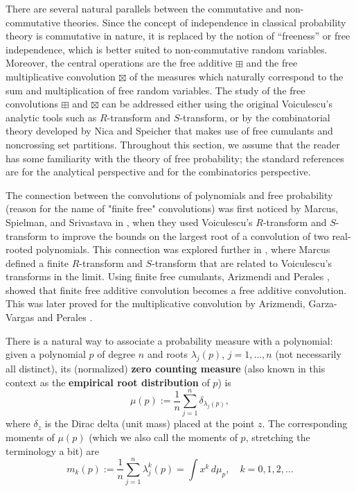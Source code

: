 \documentclass[reqno,11pt]{amsart}
\theoremstyle{remark}
\begin{document}
There are several natural parallels between the commutative and non-commutative theories. Since the concept of independence in classical probability theory is commutative in nature,  it is replaced by the notion of ``freeness'' or free independence, which is better suited to non-commutative random variables. Moreover, the central operations are the free additive $\boxplus$ and the free multiplicative convolution $\boxtimes$ of the measures which naturally correspond to the sum and multiplication of free random variables. The study of the free convolutions $\boxplus$ and $\boxtimes$ can be addressed either using the original Voiculescu's analytic tools such as $R$-transform and $S$-transform, or by the combinatorial theory developed by Nica and Speicher that makes use of free cumulants and noncrossing set partitions. Throughout this section, we assume that the reader has some familiarity with the theory of free probability; the standard references are \cite{DanKenAndu} for the analytical perspective and \cite{nica2006lectures} for the combinatorics perspective.

The connection between the convolutions of polynomials and free probability (reason for the name of "finite free" convolutions) was first noticed by Marcus, Spielman, and Srivastava in \cite{MR4408504}, when they used Voiculescu's $R$-transform and $S$-transform to improve the bounds on the largest root of a convolution of two real-rooted polynomials. This connection was explored further in \cite{marcus}, where Marcus defined a finite $R$-transform and $S$-transform that are related to Voiculescu's transforms in the limit. Using finite free cumulants, Arizmendi and Perales \cite{arizmendi2018cumulants}, showed that finite free additive convolution becomes a free additive convolution. This was later proved for the multiplicative convolution by Arizmendi, Garza-Vargas and Perales \cite{arizmendi2021finite}.

There is a natural way to associate a probability measure with a polynomial: given a polynomial $p$ of degree $n$ and roots $\lambda_j(p)$, $j=1, \dots, n$ (not necessarily all distinct),  its (normalized) \textbf{zero counting measure} (also known in this context as the \textbf{empirical root distribution} of $p$) is
\begin{equation}
    \label{def:zerocountingmeasure}
    \mu (p):=\frac{1}{n}\sum_{j=1}^n \delta_{\lambda_j(p)},
\end{equation}
where $\delta_z$ is the Dirac delta (unit mass) placed at the point $z$. The corresponding moments of $\mu(p)$ (which we also call the moments of $p$, stretching the terminology a bit) are
$$
m_k(p):=\frac{1}{n}\sum_{j=1}^n \lambda_j^k(p)=\int x^k \, d\mu_p, \quad k=0, 1, 2,\dots
$$
\end{document}
